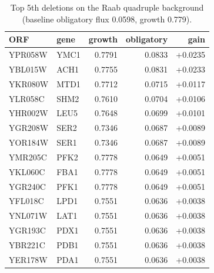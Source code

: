 \begin{longtable}{llrrr}
\caption{Top 5th deletions on the Raab quadruple background (baseline obligatory flux 0.0598, growth 0.779).}\label{tab:fifth}\\
\hline\hline
ORF & gene & growth & obligatory & gain\\
\hline
YPR058W & YMC1 & 0.7791 & 0.0833 & +0.0235\\
YBL015W & ACH1 & 0.7755 & 0.0831 & +0.0233\\
YKR080W & MTD1 & 0.7712 & 0.0715 & +0.0117\\
YLR058C & SHM2 & 0.7610 & 0.0704 & +0.0106\\
YHR002W & LEU5 & 0.7648 & 0.0699 & +0.0101\\
YGR208W & SER2 & 0.7346 & 0.0687 & +0.0089\\
YOR184W & SER1 & 0.7346 & 0.0687 & +0.0089\\
YMR205C & PFK2 & 0.7778 & 0.0649 & +0.0051\\
YKL060C & FBA1 & 0.7778 & 0.0649 & +0.0051\\
YGR240C & PFK1 & 0.7778 & 0.0649 & +0.0051\\
YFL018C & LPD1 & 0.7551 & 0.0636 & +0.0038\\
YNL071W & LAT1 & 0.7551 & 0.0636 & +0.0038\\
YGR193C & PDX1 & 0.7551 & 0.0636 & +0.0038\\
YBR221C & PDB1 & 0.7551 & 0.0636 & +0.0038\\
YER178W & PDA1 & 0.7551 & 0.0636 & +0.0038\\
\hline
\end{longtable}
